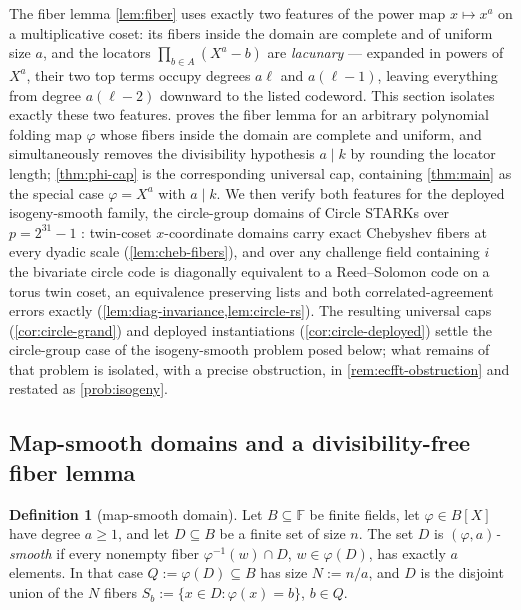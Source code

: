 \documentclass[11pt]{article}
\theoremstyle{definition}
\newtheorem{definition}[theorem]{Definition}
\theoremstyle{remark}
\newcommand{\F}{\mathbb{F}}
\newcommand{\B}{B}
\begin{document}
The fiber lemma \cref{lem:fiber} uses exactly two features of the power map $x\mapsto x^a$ on a multiplicative coset: its fibers inside the domain are complete and of uniform size $a$, and the locators $\prod_{b\in A}(X^a-b)$ are \emph{lacunary} --- expanded in powers of $X^a$, their two top terms occupy degrees $a\ell$ and $a(\ell-1)$, leaving everything from degree $a(\ell-2)$ downward to the listed codeword. This section isolates exactly these two features.  proves the fiber lemma for an arbitrary polynomial folding map $\varphi$ whose fibers inside the domain are complete and uniform, and simultaneously removes the divisibility hypothesis $a\mid k$ by rounding the locator length; \cref{thm:phi-cap} is the corresponding universal cap, containing \cref{thm:main} as the special case $\varphi=X^a$ with $a\mid k$. We then verify both features for the deployed isogeny-smooth family, the circle-group domains of Circle STARKs over $p=2^{31}-1$ \cite{HLP24}: twin-coset $x$-coordinate domains carry exact Chebyshev fibers at every dyadic scale (\cref{lem:cheb-fibers}), and over any challenge field containing $i$ the bivariate circle code is diagonally equivalent to a Reed--Solomon code on a torus twin coset, an equivalence preserving lists and both correlated-agreement errors exactly (\cref{lem:diag-invariance,lem:circle-rs}). The resulting universal caps (\cref{cor:circle-grand}) and deployed instantiations (\cref{cor:circle-deployed}) settle the circle-group case of the isogeny-smooth problem posed below; what remains of that problem is isolated, with a precise obstruction, in \cref{rem:ecfft-obstruction} and restated as \cref{prob:isogeny}.

\subsection{Map-smooth domains and a divisibility-free fiber lemma}
\label{sec:map-smooth}

\begin{definition}[map-smooth domain]\label{def:map-smooth}
Let $\B\subseteq\F$ be finite fields, let $\varphi\in\B[X]$ have degree $a\ge1$, and let $D\subseteq\B$ be a finite set of size $n$. The set $D$ is \emph{$(\varphi,a)$-smooth} if every nonempty fiber $\varphi^{-1}(w)\cap D$, $w\in\varphi(D)$, has exactly $a$ elements. In that case $Q:=\varphi(D)\subseteq\B$ has size $N:=n/a$, and $D$ is the disjoint union of the $N$ fibers $S_b:=\{x\in D:\varphi(x)=b\}$, $b\in Q$.
\end{definition}
\end{document}
